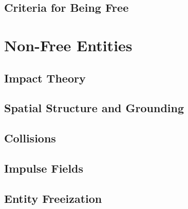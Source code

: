 \documentclass{book}
\theoremstyle{definition}\newtheorem{mechanism}{Mechanism}
\theoremstyle{remark}\newtheorem*{remark}{Remark}
\begin{document}

\section{Criteria for Being Free}



\chapter{Non-Free Entities}

\section{Impact Theory}


\section{Spatial Structure and Grounding}


\section{Collisions}


\section{Impulse Fields}


\section{Entity Freeization}


\end{document}
